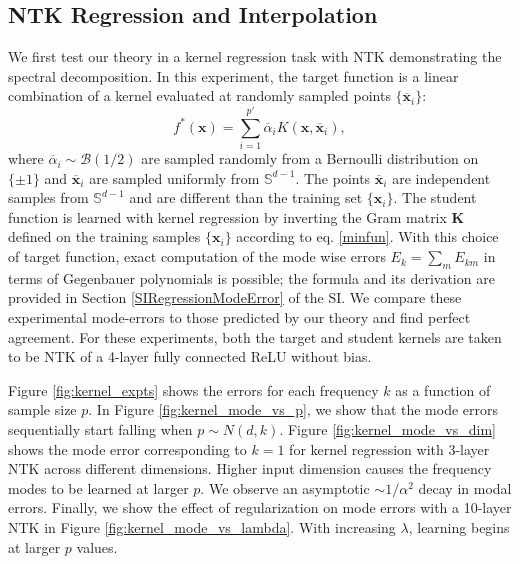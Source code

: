 \documentclass{article}
\begin{document}
\subsection{NTK Regression and Interpolation}\label{sec:reg_expts}

We first test our theory in a kernel regression task with NTK demonstrating the spectral decomposition. In this experiment, the target function is a linear combination of a kernel evaluated at randomly sampled points $\{\mathbf{\overline{x}}_i\}$:
\begin{equation}\label{synthetic_teacher}
    f^*(\mathbf{x}) = \sum_{i=1}^{p'} \overline{\alpha}_i K(\mathbf{x}, \mathbf{\overline{x}}_i),
\end{equation}
%
where $\overline{\alpha}_i \sim \mathcal{B}(1/2)$ are sampled randomly from a Bernoulli distribution on $\{\pm 1\}$ and $\mathbf{\overline{x}}_i$ are sampled uniformly from $\mathbb{S}^{d-1}$. The points $\mathbf{\overline{x}}_i$ are independent samples from $\mathbb{S}^{d-1}$ and are different than the training set $\{\mathbf{x}_i\}$. The student function is learned with kernel regression by inverting the Gram matrix $\mathbf{K}$ defined on the training samples $\{\mathbf{x}_i\}$ according to eq. \eqref{minfun}. With this choice of target function, exact computation of the mode wise errors $E_k = \sum_{m} E_{km}$ in terms of Gegenbauer polynomials is possible; the formula and its derivation are provided in Section \ref{SIRegressionModeError} of the SI. We compare these experimental mode-errors to those predicted by our theory and find perfect agreement.
For these experiments, both the target and student kernels are taken to be NTK of a 4-layer fully connected ReLU without bias. 

Figure \ref{fig:kernel_expts} shows the errors for each frequency $k$ as a function of sample size $p$. In Figure \ref{fig:kernel_mode_vs_p}, we show that the mode errors sequentially start falling when $p \sim N(d,k)$. Figure \ref{fig:kernel_mode_vs_dim} shows the mode error corresponding to $k=1$ for kernel regression with 3-layer NTK across different dimensions. Higher input dimension causes the frequency modes to be learned at larger $p$. We observe an asymptotic $\sim1/\alpha^2$ decay in modal errors. Finally, we show the effect of regularization on mode errors with a 10-layer NTK in Figure \ref{fig:kernel_mode_vs_lambda}. With increasing $\lambda$, learning begins at larger $p$ values.
\end{document}
